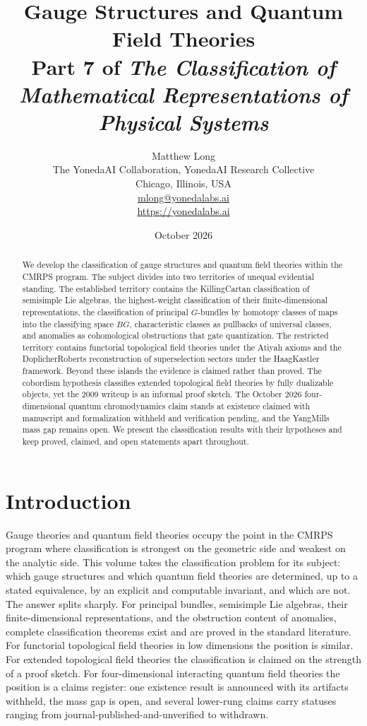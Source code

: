 \documentclass[11pt,letterpaper]{article}
\title{Gauge Structures and Quantum Field Theories\\[4pt]
  {\normalsize Part 7 of \emph{The Classification of Mathematical Representations of Physical Systems}}}
\author{Matthew Long\\
  \small The YonedaAI Collaboration, YonedaAI Research Collective\\
  \small Chicago, Illinois, USA\\
  \small \href{mailto:mlong@yonedalabs.ai}{mlong@yonedalabs.ai}\\
  \small \url{https://yonedalabs.ai}}
\date{October 2026}
\theoremstyle{definition}
\theoremstyle{remark}
\begin{document}
\maketitle

\begin{abstract}
We develop the classification of gauge structures and quantum field theories within the CMRPS program. The subject divides into two territories of unequal evidential standing. The established territory contains the Killing\textendash{}Cartan classification of semisimple Lie algebras, the highest-weight classification of their finite-dimensional representations, the classification of principal $G$-bundles by homotopy classes of maps into the classifying space $BG$, characteristic classes as pullbacks of universal classes, and anomalies as cohomological obstructions that gate quantization. The restricted territory contains functorial topological field theories under the Atiyah axioms and the Doplicher\textendash{}Roberts reconstruction of superselection sectors under the Haag\textendash{}Kastler framework. Beyond these islands the evidence is claimed rather than proved. The cobordism hypothesis classifies extended topological field theories by fully dualizable objects, yet the 2009 writeup is an informal proof sketch. The October 2026 four-dimensional quantum chromodynamics claim stands at existence claimed with manuscript and formalization withheld and verification pending, and the Yang\textendash{}Mills mass gap remains open. We present the classification results with their hypotheses and keep proved, claimed, and open statements apart throughout.
\end{abstract}

\section{Introduction}

Gauge theories and quantum field theories occupy the point in the CMRPS program where classification is strongest on the geometric side and weakest on the analytic side. This volume takes the classification problem for its subject: which gauge structures and which quantum field theories are determined, up to a stated equivalence, by an explicit and computable invariant, and which are not. The answer splits sharply. For principal bundles, semisimple Lie algebras, their finite-dimensional representations, and the obstruction content of anomalies, complete classification theorems exist and are proved in the standard literature. For functorial topological field theories in low dimensions the position is similar. For extended topological field theories the classification is claimed on the strength of a proof sketch. For four-dimensional interacting quantum field theories the position is a claims register: one existence result is announced with its artifacts withheld, the mass gap is open, and several lower-rung claims carry statuses ranging from journal-published-and-unverified to withdrawn.
\end{document}
